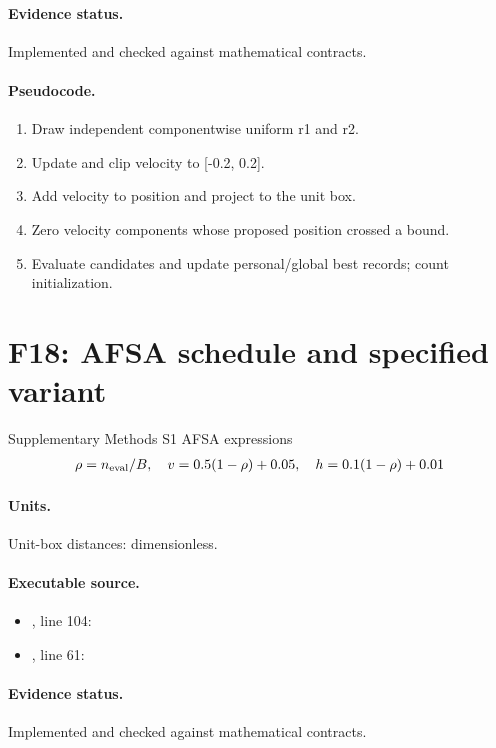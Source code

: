 \documentclass[10pt]{article}
\begin{document}
\paragraph{Evidence status.} Implemented and checked against mathematical contracts.
\paragraph{Pseudocode.}
\begin{enumerate}[leftmargin=*]
\item Draw independent componentwise uniform r1 and r2.
\item Update and clip velocity to [-0.2, 0.2].
\item Add velocity to position and project to the unit box.
\item Zero velocity components whose proposed position crossed a bound.
\item Evaluate candidates and update personal/global best records; count initialization.
\end{enumerate}
\newpage
\section*{F18: AFSA schedule and specified variant}
Supplementary Methods S1 AFSA expressions
\begin{gather*}\rho=n_{\rm eval}/B,\quad v=0.5(1-\rho)+0.05,\quad h=0.1(1-\rho)+0.01\end{gather*}
\paragraph{Units.} Unit-box distances: dimensionless.
\paragraph{Executable source.}
\begin{itemize}[leftmargin=*]
\item {}, line 104: 
\item {}, line 61: 
\end{itemize}
\paragraph{Evidence status.} Implemented and checked against mathematical contracts.
\end{document}

